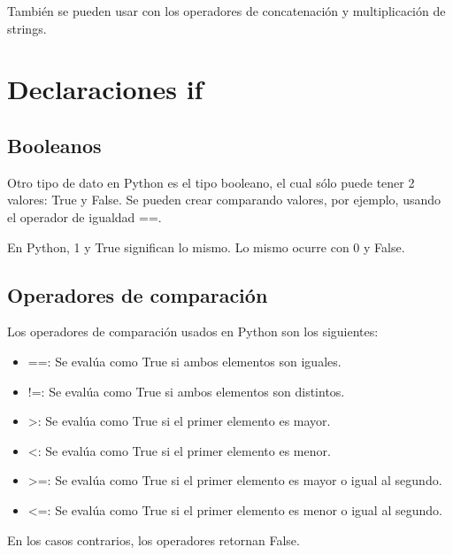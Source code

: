 \documentclass{report}
\begin{document}

También se pueden usar con los operadores de concatenación y multiplicación de strings.


\clearpage\chapter{Declaraciones if}

\section{Booleanos}

Otro tipo de dato en Python es el tipo booleano, el cual sólo puede tener 2 valores: True y False. Se pueden crear comparando valores, por ejemplo, usando el operador de igualdad ==.



En Python, 1 y True significan lo mismo. Lo mismo ocurre con 0 y False.


\section{Operadores de comparación}

Los operadores de comparación usados en Python son los siguientes:

\begin{itemize}
  \item ==: Se evalúa como True si ambos elementos son iguales.
  \item !=: Se evalúa como True si ambos elementos son distintos.
  \item >: Se evalúa como True si el primer elemento es mayor.
  \item <: Se evalúa como True si el primer elemento es menor.
  \item >=: Se evalúa como True si el primer elemento es mayor o igual al segundo.
  \item <=: Se evalúa como True si el primer elemento es menor o igual al segundo.
\end{itemize}

En los casos contrarios, los operadores retornan False.
\end{document}
